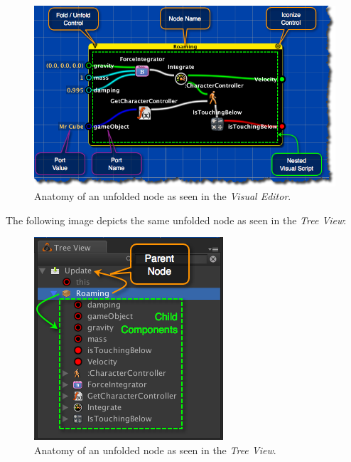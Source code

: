 \begin{figure}[htbp]
\centering
\includegraphics[keepaspectratio,width=\textwidth,height=0.75\textheight]{ics-anatomy-of-a-node.png}
\caption{Anatomy of an unfolded node as seen in the \emph{Visual Editor}.}
\label{ics-anatomy-of-a-node.png}
\end{figure}

The following image depicts the same unfolded node as seen in the \emph{Tree View}:

\begin{figure}[htbp]
\centering
\includegraphics[keepaspectratio,width=\textwidth,height=0.75\textheight]{ics-hierarchy-tree-example.png}
\caption{Anatomy of an unfolded node as seen in the \emph{Tree View}.}
\label{ics-hierarchy-tree-example.png}
\end{figure}

